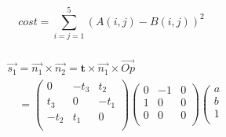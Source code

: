 \documentclass{article}
\begin{document}
\begin{CJK*}{GBK}{song}
\begin{equation}\left.
cost=\sum\limits_{i=j=1}^5(A(i,j)-B(i,j))^2
\right.\tag{4.1}\end{equation}

\begin{equation}\left.\begin{aligned}\\&
\overrightarrow{s_1}=\overrightarrow{n_1}\times\overrightarrow{n_2}=\boldsymbol{t}\times\overrightarrow{n_1}\times\overrightarrow{Op}
\\&\quad=
                                                                    \left(
                                                                      \begin{array}{ccc}
                                                                        0    & -t_3 & t_2  \\
                                                                        t_3  & 0    & -t_1 \\
                                                                        -t_2 & t_1  & 0    \\
                                                                      \end{array}
                                                                    \right)
                                                                    \left(
                                                                      \begin{array}{ccc}
                                                                        0    & -1 & 0  \\
                                                                        1  & 0    & 0 \\
                                                                        0 & 0  & 0    \\
                                                                      \end{array}
                                                                    \right)
                                                                    \left(
                                                                      \begin{array}{c}
                                                                        a \\
                                                                        b \\
                                                                        1 \\

\end{array}
\end{aligned}
\end{equation}
\end{CJK*}
\end{document}
